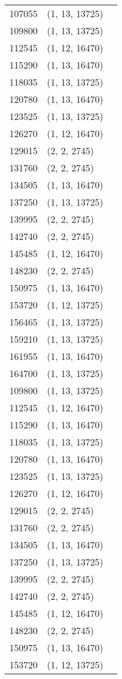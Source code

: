 \begin{longtable}{|l|l|l|}
		107055 & (1, 13, 13725) \\
		109800 & (1, 13, 13725) \\
		112545 & (1, 12, 16470)  \\
		115290 & (1, 13, 16470) \\
		118035 & (1, 13, 13725) \\
		120780 & (1, 13, 16470) \\
		123525 & (1, 13, 13725) \\
		126270 & (1, 12, 16470) \\
		129015 & (2, 2, 2745) \\
		131760 & (2, 2, 2745)  \\
		134505 & (1, 13, 16470) \\
		137250 & (1, 13, 13725)\\
		139995 & (2, 2, 2745)  \\
		142740 & (2, 2, 2745)  \\
		145485 & (1, 12, 16470) \\
		148230 & (2, 2, 2745)  \\
		150975 & (1, 13, 16470)  \\
		153720 & (1, 12, 13725) \\
		156465 & (1, 13, 13725)  \\
		159210 & (1, 13, 13725)  \\
		161955 & (1, 13, 16470)  \\
		164700 & (1, 13, 13725) \\
		109800 & (1, 13, 13725) \\
		112545 & (1, 12, 16470)  \\
		115290 & (1, 13, 16470) \\
		118035 & (1, 13, 13725) \\
		120780 & (1, 13, 16470) \\
		123525 & (1, 13, 13725) \\
		126270 & (1, 12, 16470) \\
		129015 & (2, 2, 2745) \\
		131760 & (2, 2, 2745)  \\
		134505 & (1, 13, 16470) \\
		137250 & (1, 13, 13725)\\
		139995 & (2, 2, 2745)  \\
		142740 & (2, 2, 2745)  \\
		145485 & (1, 12, 16470) \\
		148230 & (2, 2, 2745)  \\
		150975 & (1, 13, 16470)  \\
		153720 & (1, 12, 13725) \\
	\end{longtable}
	

